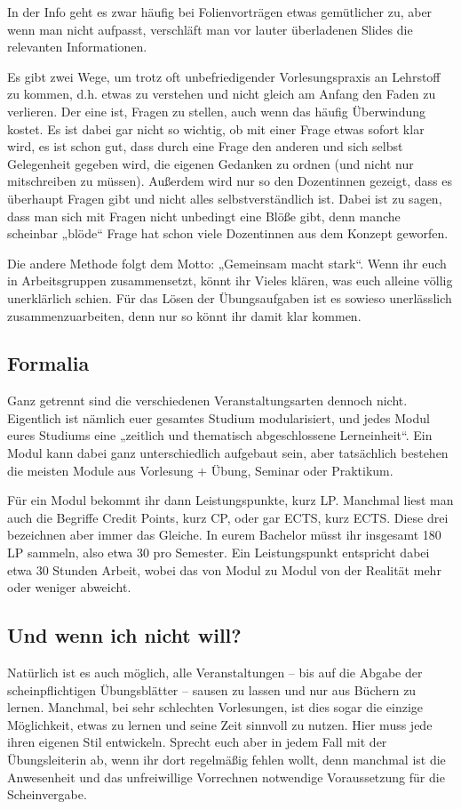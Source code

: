 In der Info geht es zwar häufig bei Folienvorträgen etwas gemütlicher zu, aber wenn man nicht aufpasst, verschläft man vor lauter überladenen Slides die relevanten Informationen.

Es gibt zwei Wege, um trotz oft unbefriedigender Vorlesungspraxis an Lehrstoff zu kommen, d.h. etwas zu verstehen und nicht gleich am Anfang den Faden zu verlieren. Der eine ist, Fragen zu stellen, auch wenn das häufig Überwindung kostet. Es ist dabei gar nicht so wichtig, ob mit einer Frage etwas sofort klar wird, es ist schon gut, dass durch eine Frage den anderen und sich selbst Gelegenheit gegeben wird, die eigenen Gedanken zu ordnen (und nicht nur mitschreiben zu müssen). Außerdem wird nur so den Dozentinnen gezeigt, dass es überhaupt Fragen gibt und nicht alles selbstverständlich ist. Dabei ist zu sagen, dass man sich mit Fragen nicht unbedingt eine Blöße gibt, denn manche scheinbar „blöde“ Frage hat schon viele Dozentinnen aus dem Konzept geworfen.

Die andere Methode folgt dem Motto: „Gemeinsam macht stark“. Wenn ihr euch in Arbeitsgruppen zusammensetzt, könnt ihr Vieles klären, was euch alleine völlig unerklärlich schien. Für das Lösen der Übungsaufgaben ist es sowieso unerlässlich zusammenzuarbeiten, denn nur so könnt ihr damit klar kommen.
\vspace{-2mm}

\subsection{Formalia}

Ganz getrennt sind die verschiedenen Veranstaltungsarten dennoch nicht. Eigentlich ist nämlich euer gesamtes Studium modularisiert, und jedes Modul eures Studiums eine „zeitlich und thematisch abgeschlossene Lerneinheit“. Ein Modul kann dabei ganz unterschiedlich aufgebaut sein, aber tatsächlich bestehen die meisten Module aus Vorlesung + Übung, Seminar oder Praktikum.

Für ein Modul bekommt ihr dann Leistungspunkte, kurz \gls{LP}. Manchmal liest man auch die Begriffe Credit Points, kurz \gls{CP}, oder gar \gls{ECTS}, kurz ECTS. Diese drei bezeichnen aber immer das Gleiche. In eurem Bachelor müsst ihr insgesamt 180 \gls{LP} sammeln, also etwa 30 pro Semester. Ein Leistungspunkt entspricht dabei etwa 30 Stunden Arbeit, wobei das von Modul zu Modul von der Realität mehr oder weniger abweicht.

\subsection{Und wenn ich nicht will?}

Natürlich ist es auch möglich, alle Veranstaltungen -- bis auf die Abgabe der scheinpflichtigen Übungsblätter -- sausen zu lassen und nur aus Büchern zu lernen. Manchmal, bei sehr schlechten Vorlesungen, ist dies sogar die einzige Möglichkeit, etwas zu lernen und seine Zeit sinnvoll zu nutzen. Hier muss jede ihren eigenen Stil entwickeln. Sprecht euch aber in jedem Fall mit der Übungsleiterin ab, wenn ihr dort regelmäßig fehlen wollt, denn manchmal ist die Anwesenheit und das unfreiwillige Vorrechnen notwendige Voraussetzung für die Scheinvergabe.
